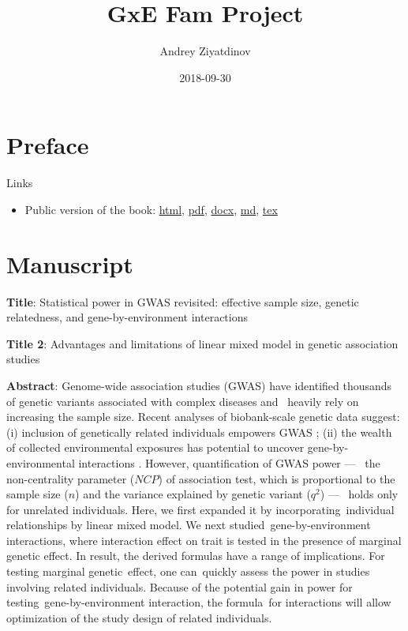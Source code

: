 \documentclass[]{book}
\title{GxE Fam Project}
\author{Andrey Ziyatdinov}
\date{2018-09-30}
\providecommand{\tightlist}{%
  \setlength{\itemsep}{0pt}\setlength{\parskip}{0pt}}
\begin{document}
\maketitle

\setlength{\abovedisplayskip}{-5pt}
\setlength{\abovedisplayshortskip}{-5pt}

{
\hypersetup{linkcolor=black}
\setcounter{tocdepth}{2}
\tableofcontents
}
\chapter*{Preface}\label{preface}

Links

\begin{itemize}
\tightlist
\item
  Public version of the book:
  \href{https://hemostat.github.io/Public/Papers/05-int-rel/bookdown/index.html}{html},
  \href{https://hemostat.github.io/Public/Papers/05-int-rel/bookdown/gxefam.pdf}{pdf},
  \href{https://hemostat.github.io/Public/Papers/05-int-rel/bookdown/gxefam.docx}{docx},
  \href{https://raw.githubusercontent.com/hemostat/Public/gh-pages/Papers/05-int-rel/bookdown/gxefam.md}{md},
  \href{https://hemostat.github.io/Public/Papers/05-int-rel/bookdown/gxefam.tex}{tex}
\end{itemize}

\chapter{Manuscript}\label{manuscript}

\textbf{Title}: Statistical power in GWAS revisited: effective sample
size, genetic relatedness, and gene-by-environment interactions

\textbf{Title 2}: Advantages and limitations of linear mixed model in
genetic association studies

\textbf{Abstract}: Genome-wide association studies (GWAS) have
identified thousands of genetic variants associated with complex
diseases and~ heavily rely on increasing the sample size. Recent
analyses of biobank-scale genetic data suggest: (i) inclusion of
genetically related individuals empowers GWAS \citep{loh2018mixed}; (ii)
the wealth of collected environmental exposures has potential to uncover
gene-by-environmental interactions \citep{young2016multiple}. However,
quantification of GWAS power ---~ the non-centrality parameter (\(NCP\))
of association test, which is proportional to the sample size (\(n\))
and the variance explained by genetic variant (\(q^2\)) ---~ holds only
for unrelated individuals. Here, we first expanded it by
incorporating~individual relationships by linear mixed model. We next
studied~gene-by-environment interactions, where interaction effect on
trait is tested in the presence of marginal genetic effect. In result,
the derived formulas have a range of implications. For testing marginal
genetic~effect, one can~quickly assess the power in studies involving
related individuals. Because of the potential gain in power for
testing~gene-by-environment interaction, the formula~for interactions
will allow optimization of the study design of related individuals.
\end{document}
